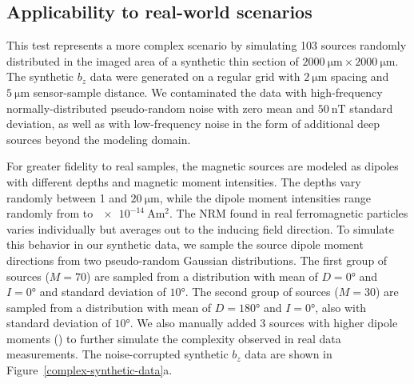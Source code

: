 \subsection{Applicability to real-world scenarios}

This test represents a more complex scenario by simulating 103 sources randomly distributed in the imaged area of a synthetic thin section of $\qty{2000}{\um} \times \qty{2000}{\um}$.
The synthetic $b_z$ data were generated on a regular grid with $\qty{2}{\um}$ spacing and $\qty{5}{\um}$ sensor-sample distance.
We contaminated the data with high-frequency normally-distributed pseudo-random noise with zero mean and $\qty{50}{\nano\tesla}$ standard deviation, as well as with low-frequency noise in the form of additional deep sources beyond the modeling domain.

For greater fidelity to real samples, the magnetic sources are modeled as dipoles with different depths and magnetic moment intensities.
The depths vary randomly between 1 and $\qty{20}{\um}$, while the dipole moment intensities range randomly from \DIFdelbegin {}\DIFdelend \DIFaddbegin {}\DIFaddend to $\qty{e-14}{\ampere\m\squared}$.
The NRM found in real ferromagnetic particles varies individually but averages out to the inducing field direction.
To simulate this behavior in our synthetic data, we sample the source dipole moment directions from two pseudo-random Gaussian distributions.
The first group of sources ($M = 70$) are sampled from a distribution  with mean of $D = \ang{0}$ and $I = \ang{0}$ and standard deviation of $\ang{10}$.
The second group of sources ($M = 30$) are sampled from a distribution with mean of $D = \ang{180}$ and $I = \ang{0}$, also with standard deviation of $\ang{10}$. We also manually added 3 sources with higher dipole moments (\DIFdelbegin {}\DIFdelend \DIFaddbegin {}\DIFaddend ) to further simulate the complexity observed in real data measurements. The noise-corrupted synthetic $b_z$ data are shown in Figure~\ref{complex-synthetic-data}a.

